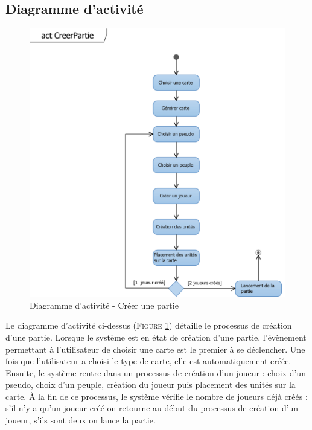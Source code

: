 \documentclass[a4paper,11pt]{article}
\begin{document}
	\subsection{Diagramme d'activité}
		\vspace*{0.5cm}
		\begin{figure}[ht!]
			\includegraphics{Diagrammes/Creation/actCreerPartie.png}
			\caption{Diagramme d'activité - Créer une partie}
			\label{fig:actcreer}
		\end{figure}
		\vspace*{1cm}
		Le diagramme d'activité ci-dessus (\textsc{Figure \ref{fig:actcreer}}) détaille le processus de création d'une partie. Lorsque le système est en état de création d'une partie, l'évènement permettant à l'utilisateur de choisir une carte est le premier à se déclencher. Une fois que l'utilisateur a choisi le type de carte, elle est automatiquement créée. Ensuite, le système rentre dans un processus de création d'un joueur : choix d'un pseudo, choix d'un peuple, création du joueur puis placement des unités sur la carte. À la fin de ce processus, le système vérifie le nombre de joueurs déjà créés : s'il n'y a qu'un joueur créé on retourne au début du processus de création d'un joueur, s'ils sont deux on lance la partie.
		\newpage
\end{document}
